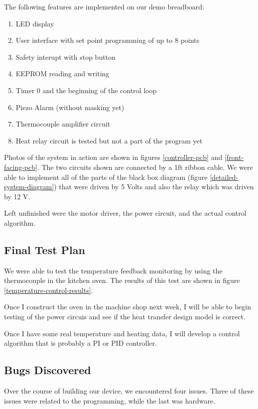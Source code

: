 \documentclass[10pt, twocolumn]{article}
\begin{document}
The following features are implemented on
our demo breadboard:
\begin{enumerate}
\item LED display
\item User interface with set point programming of up to 8 points
\item Safety interupt with stop button
\item EEPROM reading and writing
\item Timer 0 and the beginning of the control loop
\item Piezo Alarm (without masking yet)
\item Thermocouple amplifier circuit
\item Heat relay circuit is tested but not a part of the program yet
\end{enumerate}

Photos of the system in action are shown in figures
\ref{controller-pcb} and \ref{front-facing-pcb}. The two
circuits shown are connected by a 1ft ribbon cable.
We were able to implement all of the parts of the black box diagram
(figure \ref{detailed-system-diagram}) that were driven by 5 Volts
and also the relay which was driven by 12 V.

Left unfinished were the motor driver, the power circuit, and the
actual control algorithm.

\subsection{Final Test Plan}

We were able to test the temperature feedback monitoring by using
the thermocouple in the kitchen oven. The results of this test are
shown in figure \ref{temperature-control-results}.

Once I construct the oven in the machine shop next week,
I will be able to begin testing of the power circuis and see if the heat 
transfer design model is correct.

Once I have some real temperature and heating data, I will develop a control
algorithm that is probably a PI or PID controller.

\subsection{Bugs Discovered}

Over the course of building our device, we encountered four issues.
Three of these issues were related to the programming, while the last was hardware.
\end{document}
